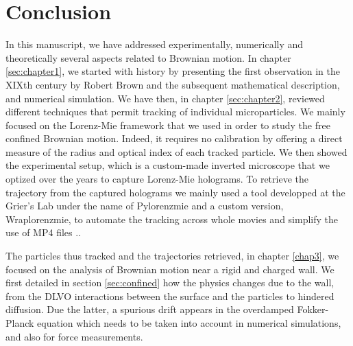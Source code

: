











































\section{Conclusion}

In this manuscript, we have addressed experimentally, numerically and theoretically several aspects related to  Brownian motion. In chapter \ref{sec:chapter1}, we started with history by presenting the first observation in the XIXth century by Robert Brown and the subsequent mathematical description, and numerical simulation. We have then, in chapter \ref{sec:chapter2}, reviewed different techniques that permit tracking of individual microparticles. We mainly focused on the Lorenz-Mie framework that we used in order to study the free confined Brownian motion. Indeed, it requires no calibration by offering a direct measure of the radius and optical index of each tracked particle. We then showed the experimental setup, which is a custom-made inverted microscope that we optized over the years to capture Lorenz-Mie holograms. To retrieve the trajectory from the captured holograms we mainly used a tool developped at the Grier's Lab under the name of Pylorenzmie \href{https://github.com/davidgrier/pylorenzmie}{\faGithub} and a custom version, Wraplorenzmie, to automate the tracking across whole movies and simplify the use of MP4 files \href{https://github.com/eXpensia/wraplorenzmie}{\faGithub}..

The particles thus tracked and the trajectories retrieved, in chapter \ref{chap3}, we focused on the analysis of Brownian motion near a rigid and charged wall. We first detailed in section \ref{sec:confined} how the physics changes due to the wall, from the DLVO interactions between the surface and the particles to hindered diffusion. Due the latter, a spurious drift appears in the overdamped Fokker-Planck equation which needs to be taken into account in numerical simulations, and also for force measurements.

